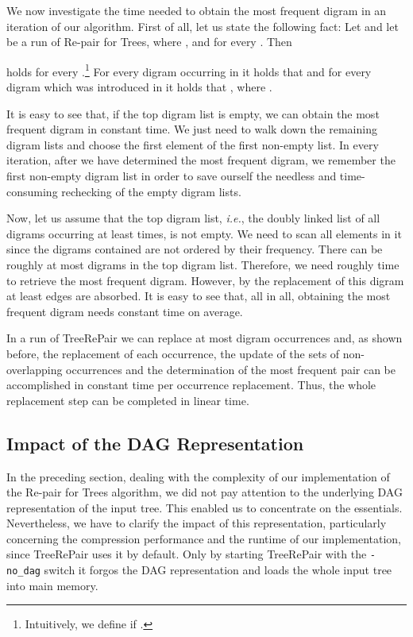 \documentclass[12pt]{llncs}
\newcommand{\tp}{digram\xspace}
\newcommand{\tps}{digrams\xspace}
\newcommand{\trp}{\mbox{TreeRePair}\xspace}
\newcommand{\hairsp}{\hspace{1pt}}\newcommand{\TODO}{\textcolor{red}{\bf TODO!}\xspace}
\newcommand{\ie}{\mbox{\textit{i.\hairsp{}e.}}\xspace}
\begin{document}
We now investigate the time needed to obtain the most frequent \tp in an iteration of our algorithm. First of all, let us state the following fact: Let  and let  be a run of Re-pair for Trees, where ,  and  for every . Then

holds for every .\footnote{Intuitively, we define  if .} For every \tp  occurring in  it holds that  and for every \tp  which was introduced in  it holds that , where .

It is easy to see that, if the top \tp list is empty, we can obtain the most frequent \tp in constant time. We just need to walk down the remaining  \tp lists and choose the first element of the first non-empty list. In every iteration, after we have determined the most frequent \tp, we remember the first non-empty \tp list in order to save ourself the needless and time-consuming rechecking of the empty \tp lists.

Now, let us assume that the top \tp list, \ie, the doubly linked list of all \tps occurring at least  times, is not empty. We need to scan all elements in it since the \tps contained are not ordered by their frequency. There can be roughly at most  \tps in the top \tp list. Therefore, we need roughly  time to retrieve the most frequent \tp. However, by the replacement of this \tp at least  edges are absorbed. It is easy to see that, all in all, obtaining the most frequent \tp needs constant time on average.

In a run of \trp we can replace at most  \tp occurrences and, as shown before, the replacement of each occurrence, the update of the sets of non-overlapping occurrences and the determination of the most frequent pair can be accomplished in constant time per occurrence replacement. Thus, the whole replacement step can be completed in linear time.

\subsection{Impact of the DAG Representation}\label{sec:impactDag}

In the preceding section, dealing with the complexity of our implementation of the Re-pair for Trees algorithm, we did not pay attention to the underlying DAG representation of the input tree. This enabled us to concentrate on the essentials. Nevertheless, we have to clarify the impact of this representation, particularly concerning the compression performance and the runtime of our implementation, since \trp uses it by default. Only by starting \trp with the \texttt{-no\_dag} switch it forgos the DAG representation and loads the whole input tree into main memory.
\end{document}
